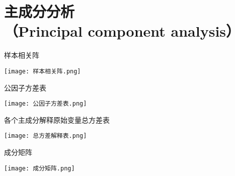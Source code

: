 
\part{主成分分析\\（Principal component analysis）}


\begin{frame}{样本相关阵}
    \begin{center}
        \texttt{[image: 样本相关阵.png]}
    \end{center}
    \vspace{-0.5cm}
\end{frame}


\begin{frame}{公因子方差表}
    \begin{center}
        \texttt{[image: 公因子方差表.png]}
    \end{center}
    \vspace{-0.5cm}
\end{frame}


\begin{frame}{各个主成分解释原始变量总方差表}
    \begin{center}
        \texttt{[image: 总方差解释表.png]}
    \end{center}
    \vspace{-0.5cm}
\end{frame}


\begin{frame}{成分矩阵}
    \begin{center}
        \texttt{[image: 成分矩阵.png]}
    \end{center}
    \vspace{-0.5cm}
\end{frame}


